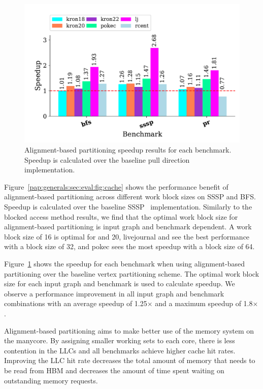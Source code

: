 \begin{figure}[h]
    \centering
    \includegraphics[scale = 0.6]{graphit-figures/align.pdf}
    \caption{Alignment-based partitioning speedup results for each benchmark. Speedup is calculated over the baseline pull direction implementation.} %
    \label{pap:generals:sec:eval:fig:aligned}
\end{figure}
 
Figure~\ref{pap:generals:sec:eval:fig:cache} shows the performance benefit of alignment-based partitioning across different work block sizes on SSSP and BFS.
Speedup is calculated over the baseline SSSP \pull~implementation. 
Similarly to the blocked access method results, we find that the optimal work block size for alignment-based partitioning is input graph and benchmark dependent. 
A work block size of 16 is optimal for  and 20, livejournal and  see the best performance with a block size of 32, and pokec sees the most speedup with a block size of 64.
 
Figure~\ref{pap:generals:sec:eval:fig:aligned} shows the speedup for each benchmark when using alignment-based partitioning over the baseline vertex partitioning scheme. The optimal work block size for each input graph and benchmark is used to calculate speedup. 
We observe a performance improvement in all input graph and benchmark combinations with an average speedup of 1.25$\times$ and a maximum speedup of 1.8$\times$. 
 
Alignment-based partitioning aims to make better use of the memory system on the manycore. 
By assigning smaller working sets to each core, there is less contention in the LLCs and all benchmarks achieve higher cache hit rates. 
Improving the LLC hit rate decreases the total amount of memory that needs to be read from HBM and decreases the amount of time spent waiting on outstanding memory requests.
 
